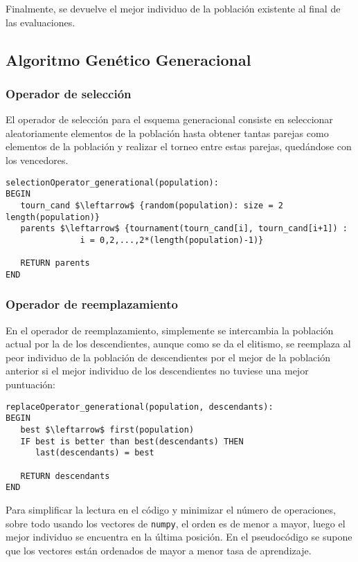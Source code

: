 \documentclass[11pt,leqno]{article}
\begin{document}
	Finalmente, se devuelve el mejor individuo de la población existente al final de las evaluaciones. 

\subsection{Algoritmo Genético Generacional}

\subsubsection{Operador de selección}

	El operador de selección para el esquema generacional consiste en seleccionar aleatoriamente elementos de la población hasta obtener tantas parejas como elementos de la población y realizar el torneo entre estas parejas, quedándose con los vencedores.
	
\begin{lstlisting}[mathescape=true]
selectionOperator_generational(population):
BEGIN
   tourn_cand $\leftarrow$ {random(population): size = 2 length(population)}
   parents $\leftarrow$ {tournament(tourn_cand[i], tourn_cand[i+1]) : 
               i = 0,2,...,2*(length(population)-1)}
   
   RETURN parents
END
\end{lstlisting}

\subsubsection{Operador de reemplazamiento}

	En el operador de reemplazamiento, simplemente se intercambia la población actual por la de los descendientes, aunque como se da el elitismo, se reemplaza al peor individuo de la población de descendientes por el mejor de la población anterior si el mejor individuo de los descendientes no tuviese una mejor puntuación:
	
\begin{lstlisting}[mathescape=true]
replaceOperator_generational(population, descendants):
BEGIN
   best $\leftarrow$ first(population)
   IF best is better than best(descendants) THEN
      last(descendants) = best
   
   RETURN descendants
END
\end{lstlisting}

Para simplificar la lectura en el código y minimizar el número de operaciones, sobre todo usando los vectores de \texttt{numpy}, el orden es de menor a mayor, luego el mejor individuo se encuentra en la última posición. En el pseudocódigo se supone que los vectores están ordenados de mayor a menor tasa de aprendizaje.
\end{document}
